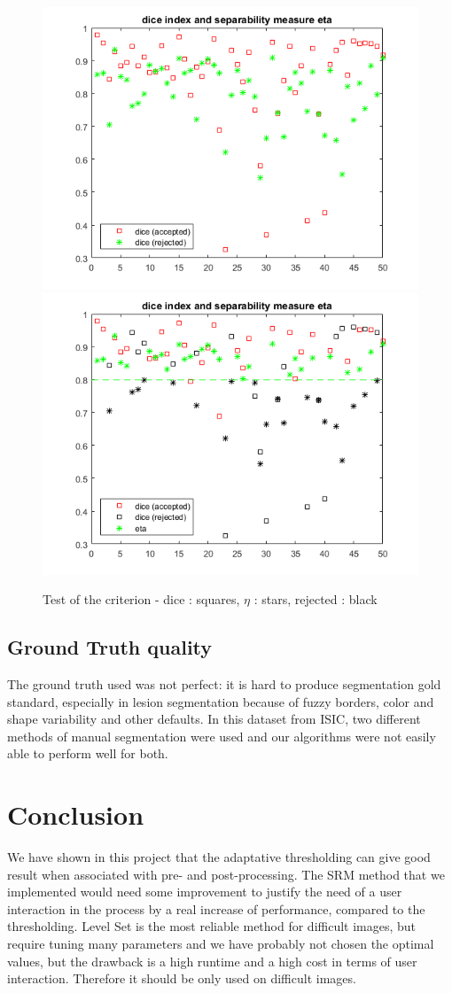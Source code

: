 \documentclass[a4paper,10pt]{article}
\begin{document}
\begin{figure}[h]
	\centering
	\includegraphics[width=0.6\linewidth]{../results/selection-criterion/test-dice-eta-plot}
	\includegraphics[width=0.6\linewidth]{../results/selection-criterion/test-dice-eta-accepted}
	\caption{Test of the criterion - dice : squares, $\eta$ : stars, rejected : black }
	\label{fig:test-criterion-accepted}
\end{figure}

\subsection*{Ground Truth quality}
The ground truth used was not perfect: it is hard to produce segmentation gold standard, especially in lesion segmentation because of fuzzy borders, color and shape variability and other defaults. In this dataset from ISIC, two different methods of manual segmentation were used and our algorithms were not easily able to perform well for both.

\section*{Conclusion}

We have shown in this project that the adaptative thresholding can give good result when associated with pre- and post-processing. The SRM method that we implemented would need some improvement to justify the need of a user interaction in the process by a real increase of performance, compared to the thresholding. Level Set is the most reliable method for difficult images, but require tuning many parameters and we have probably not chosen the optimal values, but the drawback is a high runtime and a high cost in terms of user interaction. Therefore it should be only used on difficult images.
\end{document}

